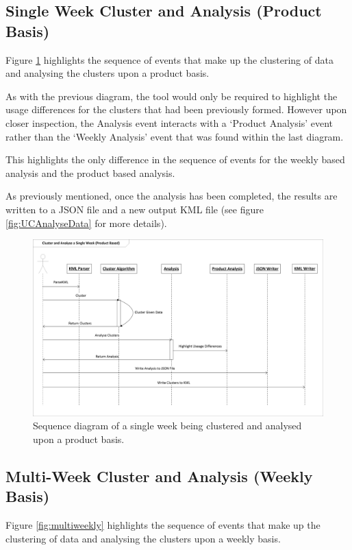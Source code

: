 \newpage
\subsection{Single Week Cluster and Analysis (Product Basis)}
Figure \ref{fig:singleproduct} highlights the sequence of events that make up 
the clustering of data and analysing the clusters upon a product basis.

As with the previous diagram, the tool would only be required to highlight the 
usage differences for the clusters that had been previously formed. However upon 
closer inspection, the Analysis event interacts with a `Product Analysis' event 
rather than the `Weekly Analysis' event that was found within the last diagram.

This highlights the only difference in the sequence of events for the weekly 
based analysis and the product based analysis.

As previously mentioned, once the analysis has been completed, the results are 
written to a JSON file and a new output KML file (see figure 
\ref{fig:UCAnalyseData} for more details).

\begin{landscape}
  \centering 
  \begin{figure}
    \centering
      \includegraphics[scale=0.8]{chapter7/sequence_diagrams/single_week_cluster_product.png}
      \caption[Sequence diagram of a single week being clustered]
              {Sequence diagram of a single week being clustered and analysed 
              upon a product basis.}
      \label{fig:singleproduct}
  \end{figure}
\end{landscape}


\newpage
\subsection{Multi-Week Cluster and Analysis (Weekly Basis)}
Figure \ref{fig:multiweekly} highlights the sequence of events that make up 
the clustering of data and analysing the clusters upon a weekly basis.

